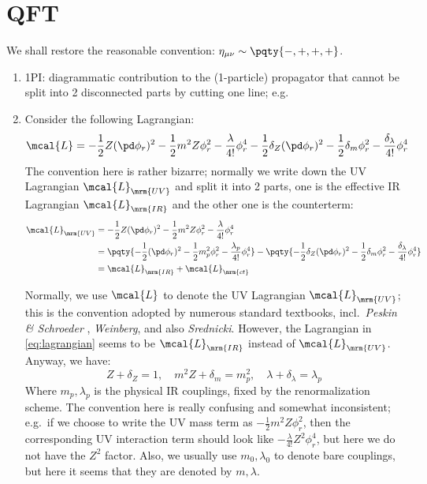 \documentclass[a4paper
	,10pt
]{article}
\begin{document}
\section{QFT}
We shall restore the reasonable convention: $
	\eta_{\mu\nu}
	\sim \pqty{-,+,+,+}
$. 
\begin{enumerate}
\item 1PI: diagrammatic contribution to the (1-particle) propagator that cannot be split into 2 disconnected parts by cutting one line; e.g.\,%
\item Consider the following Lagrangian:
	\begin{equation}
		\mcal{L}
		= -\frac{1}{2} Z(\pd\phi_r)^2
			-\frac{1}{2} m^2 Z\phi_r^2
			-\frac{\lambda}{4!} \phi_r^4
		-\frac{1}{2} \delta_Z(\pd\phi_r)^2
			-\frac{1}{2} \delta_m \phi_r^2
			-\frac{\delta_\lambda}{4!} \phi_r^4
	\label{eq:lagrangian}
	\end{equation}
	The convention here is rather bizarre; normally we write down the UV Lagrangian $\mcal{L}_{\mrm{UV}}$ and split it into 2 parts, one is the effective IR Lagrangian $\mcal{L}_{\mrm{IR}}$ and the other one is the counterterm:
	\begin{equation}
	\begin{aligned}
		\mcal{L}_{\mrm{UV}}
		&= -\frac{1}{2} Z(\pd\phi_r)^2
			-\frac{1}{2} m^2 Z\phi_r^2
			-\frac{\lambda}{4!} \phi_r^4 \\
		&= \pqty{
			-\frac{1}{2} (\pd\phi_r)^2
			-\frac{1}{2} m_p^2 \phi_r^2
			-\frac{\lambda_p}{4!} \phi_r^4
		}
		- \pqty{
			-\frac{1}{2} \delta_Z(\pd\phi_r)^2
			-\frac{1}{2} \delta_m \phi_r^2
			-\frac{\delta_\lambda}{4!} \phi_r^4
		} \\
		&= \mcal{L}_{\mrm{IR}}
			+ \mcal{L}_{\mrm{ct}}
	\end{aligned}
	\end{equation}
	
	Normally, we use $\mcal{L}$ to denote the UV Lagrangian $\mcal{L}_{\mrm{UV}}$; this is the convention adopted by numerous standard textbooks, incl.~\textit{Peskin \& Schroeder} \cite{Peskin:1995ev}, \textit{Weinberg}, and also \textit{Srednicki}. However, the Lagrangian in \eqref{eq:lagrangian} seems to be $\mcal{L}_{\mrm{IR}}$ instead of $\mcal{L}_{\mrm{UV}}$. Anyway, we have:
	\begin{equation}
		Z + \delta_Z = 1,
	\quad
		m^2 Z + \delta_m = m_p^2,
	\quad
		\lambda + \delta_\lambda = \lambda_p
	\end{equation}
	Where $m_p,\lambda_p$ is the physical IR couplings, fixed by the renormalization scheme. The convention here is really confusing and somewhat inconsistent; e.g.\ if we choose to write the UV mass term as $
		-\frac{1}{2} m^2 Z \phi_r^2
	$, then the corresponding UV interaction term should look like $
		-\frac{\lambda}{4!} Z^2 \phi_r^4
	$, but here we do not have the $Z^2$ factor. Also, we usually use $m_0,\lambda_0$ to denote bare couplings, but here it seems that they are denoted by $m,\lambda$.
	

\end{enumerate}
\end{document}
